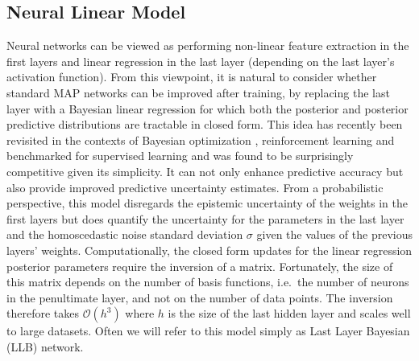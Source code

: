 \documentclass[../thesis.tex]{subfiles}
\begin{document}

\subsection{Neural Linear Model}
Neural networks can be viewed as performing non-linear feature extraction in the first layers and linear regression in the last layer (depending on the last layer's activation function). From this viewpoint, it is natural to consider whether standard MAP networks can be improved after training, by replacing the last layer with a Bayesian linear regression for which both the posterior and posterior predictive distributions are tractable in closed form. This idea has recently been revisited in the contexts of Bayesian optimization \parencite{snoek2015scalable}, reinforcement learning \parencite{riquelme2018deep} and benchmarked for supervised learning \parencite{ober2019benchmarking} and was found to be surprisingly competitive given its simplicity. It can not only enhance predictive accuracy but also provide improved predictive uncertainty estimates. From a probabilistic perspective, this model disregards the epistemic uncertainty of the weights in the first layers but does quantify the uncertainty for the parameters in the last layer and the homoscedastic noise standard deviation $\sigma$ given the values of the previous layers' weights. Computationally, the closed form updates for the linear regression posterior parameters require the inversion of a matrix. Fortunately, the size of this matrix depends on the number of basis functions, i.e.\ the number of neurons in the penultimate layer, and not on the number of data points. The inversion therefore takes $\mathcal{O}(h^3)$ where $h$ is the size of the last hidden layer and scales well to large datasets. Often we will refer to this model simply as Last Layer Bayesian (LLB) network.
    
\end{document}

